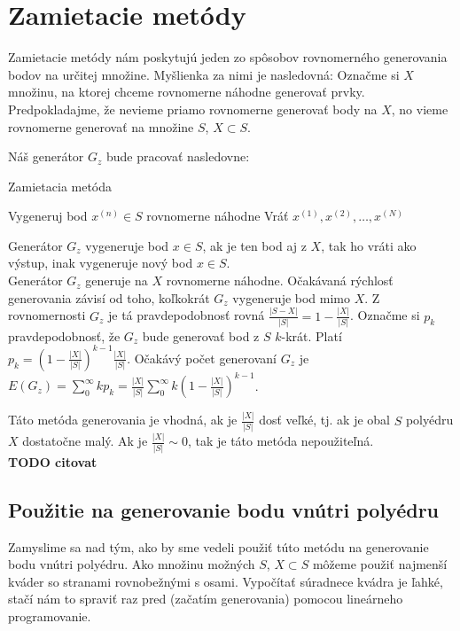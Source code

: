 \chapter{Zamietacie metódy}

Zamietacie metódy nám poskytujú jeden zo spôsobov rovnomerného generovania bodov na určitej množine.
Myšlienka za nimi je nasledovná: Označme si $X$ množinu, na ktorej chceme rovnomerne náhodne generovať prvky. Predpokladajme, že nevieme priamo rovnomerne generovať body na $X$, no vieme rovnomerne generovať na množine $S$, $X \subset S$.

Náš generátor $G_z$ bude pracovať nasledovne:

\begin{algorithm}[H]
	\caption{Zamietacia metóda}
	\label{zamietanie:basic}
	\begin{algorithmic}[1]
			\Repeat Vygeneruj bod $x^{(n)} \in S$ rovnomerne náhodne
		\EndFor
		\State Vráť ${x^{(1)},x^{(2)},\dots,x^{(N)}}$
	\end{algorithmic}
\end{algorithm}
Generátor $G_z$ vygeneruje bod $x \in S$, ak je ten bod aj z $X$, tak ho vráti ako výstup, inak vygeneruje nový bod $x \in S$.\\

Generátor $G_z$ generuje na $X$ rovnomerne náhodne. Očakávaná rýchlosť generovania závisí od toho, koľkokrát $G_z$ vygeneruje bod mimo $X$. Z rovnomernosti $G_z$ je tá pravdepodobnosť rovná $\frac{|S-X|}{|S|} = 1-\frac{|X|}{|S|}$. Označme si $p_k$ pravdepodobnosť, že $G_z$ bude generovať bod z $S$ $k$-krát. Platí $p_k= (1-\frac{|X|}{|S|})^{k-1}\frac{|X|}{|S|}$. Očakávý počet generovaní $G_z$ je $E(G_z)=\sum^{\infty}_{0}kp_k=\frac{|X|}{|S|} \sum^{\infty}_{0}k(1-\frac{|X|}{|S|})^{k-1}$.

Táto metóda generovania je vhodná, ak je $\frac{|X|}{|S|}$ dosť veľké, tj. ak je obal $S$ polyédru $X$ dostatočne malý. Ak je $\frac{|X|}{|S|} \sim 0$, tak je táto metóda nepoužiteľná.\\

\textbf{TODO citovat}

\section{Použitie na generovanie bodu vnútri polyédru}

Zamyslime sa nad tým, ako by sme vedeli použiť túto metódu na generovanie bodu vnútri polyédru. Ako množinu možných $S$, $X \subset S$ môžeme použiť najmenší kváder so stranami rovnobežnými s osami. Vypočítať súradnece kvádra je ľahké, stačí nám to spraviť raz pred (začatím generovania) pomocou lineárneho programovanie.


